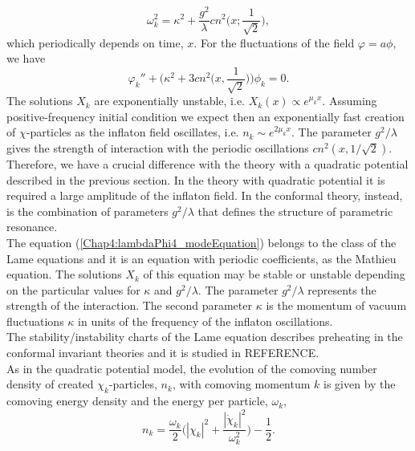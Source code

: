 \documentclass[11pt,a4paper,twoside]{book}
\begin{document}
\begin{equation}
\label{Chap4:lambdaPhi4_frequency}
\omega^{2}_{k}=\kappa^{2} + \frac{g^{2}}{\lambda}cn^{2}\Bigg(x;\frac{1}{\sqrt{2}}\Bigg),
\end{equation}
which periodically depends on time, $ x $. For the fluctuations of the field $ \varphi = a\phi $, we have
\begin{equation}
\label{Chap4:lambdaPhi4}
\varphi_{k}'' + \Bigg(\kappa^{2} + 3cn^{2}\Bigg(x,\frac{1}{\sqrt{2}}\Bigg)\Bigg)\phi_{k} = 0.
\end{equation}
The solutions $ X_{k} $ are exponentially unstable, i.e. $ X_{k}(x) \propto e^{\mu_{k}x} $. Assuming positive-frequency initial condition we expect then an exponentially fast creation of $\chi$-particles as the inflaton field oscillates, i.e. $ n_{k} \sim e^{2\mu_{k}x} $. The parameter $ g^{2}/\lambda $ gives the strength of interaction with the periodic oscillations $ cn^{2}(x,1/\sqrt{2}) $. Therefore, we have a crucial difference with the theory with a quadratic potential described in the previous section. In the theory with quadratic potential it is required a large amplitude of the inflaton field. In the conformal theory, instead, is the combination of parameters $ g^{2}/\lambda $ that defines the structure of parametric resonance.\\
The equation (\ref{Chap4:lambdaPhi4_modeEquation}) belongs to the class of the Lame equations and it is an equation with periodic coefficients, as the Mathieu equation. The solutions $ X_{k} $ of this equation may be stable or unstable depending on the particular values for $ \kappa $ and $ g^{2}/\lambda $. The parameter $ g^{2}/\lambda  $ represents the strength of the interaction. The second parameter $\kappa$ is the momentum of vacuum fluctuations $\kappa$ in units of the frequency of the inflaton oscillations.\\
The stability/instability charts of the Lame equation describes preheating in the conformal invariant theories and it is studied in REFERENCE.\\
As in the quadratic potential model, the evolution of the comoving number density of created $\chi_{k}$-particles, $ n_{k} $, with comoving momentum $ k $ is given by the comoving energy density and the energy per particle, $\omega_{k}$,
\begin{equation}
\label{Chap4:lambdaPhi4Model}
n_{k}=\frac{\omega_{k}}{2}\Bigg(|\chi_{k}|^{2} + \frac{|\dot{\chi}_{k}|^{2}}{\omega_{k}^{2}}\Bigg) - \frac{1}{2}.
\end{equation}
\end{document}
